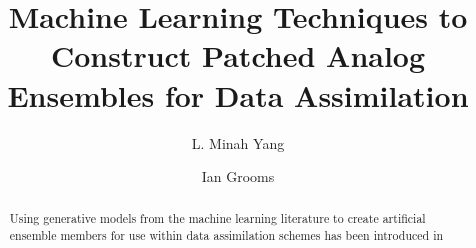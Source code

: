 \documentclass[final,3p]{elsarticle}
\theoremstyle{break}
\begin{document}
	
	\begin{frontmatter}
		
		\title{Machine Learning Techniques to Construct Patched Analog Ensembles for Data Assimilation}
		
		\author{L. Minah Yang}
		\author{Ian Grooms}
		\address{Department of Applied Mathematics, University of Colorado, Boulder, CO 80309}
		\begin{abstract}
    Using generative models from the machine learning literature to create artificial ensemble members for use within data assimilation schemes has been introduced in \cite[Grooms QJRMS, 2020]{grooms2020analog}

\end{abstract}
\end{frontmatter}
\end{document}
